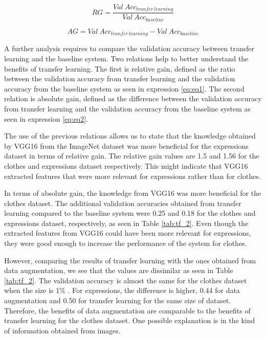 \documentclass{article}
\begin{document}
\begin{equation}
	RG = \frac{Val\ Acc_{tranfer\ learning}}{Val\ Acc_{baseline}}
	\label{eq:eq1}
\end{equation}

	


\begin{equation}
	AG = Val\ Acc_{tranfer\ learning} - Val\ Acc_{baseline}
	\label{eq:eq2}
\end{equation}





A further analysis requires to compare the validation accuracy between transfer learning and the baseline system. Two relations help to better understand the benefits of transfer learning. The first is relative gain, defined as the ratio between the validation accuracy from transfer learning and the validation accuracy from the baseline system as seen in expression \ref{eq:eq1}. The second relation is absolute gain, defined as the difference between the validation accuracy from transfer learning and the validation accuracy from the baseline system as seen in expression \ref{eq:eq2}.

The use of the previous relations allows us to state that the knowledge obtained by VGG16 from the ImageNet dataset was more beneficial for the expressions dataset in terms of relative gain. The relative gain values are 1.5 and 1.56 for the clothes and expressions dataset respectively. This might indicate that VGG16 extracted features that were more relevant for expressions rather than for clothes.

In terms of absolute gain, the knowledge from VGG16 was more beneficial for the clothes dataset. The additional validation accuracies obtained from transfer learning compared to the baseline system were 0.25 and 0.18 for the clothes and expressions dataset, respectively, as seen in Table \ref{tab:tf_2}. Even though the extracted features from VGG16 could have been more relevant for expressions, they were good enough to increase the performance of the system for clothes.

However, comparing the results of transfer learning with the ones obtained from data augmentation, we see that the values are dissimilar as seen in Table \ref{tab:tf_2}. The validation accuracy is almost the same for the clothes dataset when the size is 1\% . For expressions, the difference is higher, 0.44 for data augmentation and 0.50 for transfer learning for the same size of dataset. Therefore, the benefits of data augmentation are comparable to the benefits of transfer learning for the clothes dataset. One possible explanation is in the kind of information obtained from images.
\end{document}
